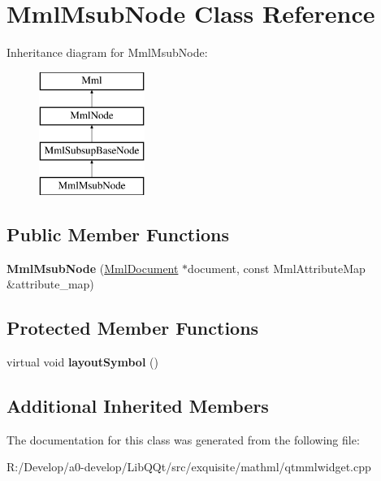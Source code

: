 \hypertarget{class_mml_msub_node}{}\section{Mml\+Msub\+Node Class Reference}
\label{class_mml_msub_node}
Inheritance diagram for Mml\+Msub\+Node\+:\begin{figure}[H]
\begin{center}
\leavevmode
\includegraphics[height=4.000000cm]{class_mml_msub_node}
\end{center}
\end{figure}
\subsection*{Public Member Functions}
\begin{DoxyCompactItemize}
\item 
\mbox{\label{class_mml_msub_node_af36d72764c89effb6460891407c32bc4}} 
{\bfseries Mml\+Msub\+Node} (\mbox{\hyperlink{class_mml_document}{Mml\+Document}} $\ast$document, const Mml\+Attribute\+Map \&attribute\+\_\+map)
\end{DoxyCompactItemize}
\subsection*{Protected Member Functions}
\begin{DoxyCompactItemize}
\item 
\mbox{\label{class_mml_msub_node_a3e149a2f48109ab54d063f37c3d83e04}} 
virtual void {\bfseries layout\+Symbol} ()
\end{DoxyCompactItemize}
\subsection*{Additional Inherited Members}


The documentation for this class was generated from the following file\+:\begin{DoxyCompactItemize}
\item 
R\+:/\+Develop/a0-\/develop/\+Lib\+Q\+Qt/src/exquisite/mathml/qtmmlwidget.\+cpp\end{DoxyCompactItemize}
